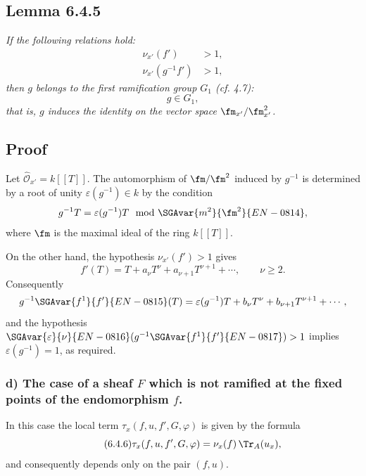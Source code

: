 \subsection*{Lemma 6.4.5}
\emph{If the following relations hold:}
\begin{align*}
\nu_{x'}(f')&>1,\\
\nu_{x'}(g^{-1}f')&>1,
\end{align*}
\emph{then $g$ belongs to the first ramification group $G_1$ (cf. 4.7):}
\[
g\in G_1,
\]
\emph{that is, $g$ induces the identity on the vector space $\fm_{x'}/\fm_{x'}^2$.}

\subsection*{Proof}
Let $\widehat{\mathcal O}_{x'}=k[[T]]$. The automorphism of $\fm/\fm^2$ induced by $g^{-1}$ is determined by a root of unity $\varepsilon(g^{-1})\in k$ by the condition
\[
g^{-1}T=\varepsilon(g^{-1})T\mod \SGAvar{m^2}{\fm^2}{EN-0814},
\]
where $\fm$ is the maximal ideal of the ring $k[[T]]$.

On the other hand, the hypothesis $\nu_{x'}(f')>1$ gives
\[
f'(T)=T+a_\nu T^\nu+a_{\nu+1}T^{\nu+1}+\cdots,
\qquad \nu\ge2.
\]
Consequently
\[
g^{-1}\SGAvar{f^{1}}{f'}{EN-0815}(T)=\varepsilon(g^{-1})T+b_\nu T^\nu+b_{\nu+1}T^{\nu+1}+\cdots,
\]
and the hypothesis $\SGAvar{\varepsilon}{\nu}{EN-0816}(g^{-1}\SGAvar{f^{1}}{f'}{EN-0817})>1$ implies $\varepsilon(g^{-1})=1$, as required.

\subsubsection*{d) The case of a sheaf $F$ which is not ramified at the fixed points of the endomorphism $f$.}
In this case the local term $\tau_x(f,u,f',G,\varphi)$ is given by the formula
\begin{equation}\tag{6.4.6}
\tau_x(f,u,f',G,\varphi)=\nu_x(f)\,\Tr_A(u_x),
\end{equation}
and consequently depends only on the pair $(f,u)$.

